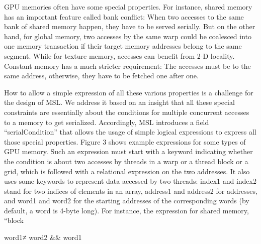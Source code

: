 \documentclass{sig-alternate}
\begin{document}
GPU memories often have some special properties. For instance, shared memory has an important feature called bank conflict: When two accesses to the same bank of shared memory happen, they have to be served serially. But on the other hand, for global memory, two accesses by the same warp could be coalesced into one memory transaction if their target memory addresses belong to the same segment. While for texture memory, accesses can benefit from 2-D locality. Constant memory has a much stricter requirement: The accesses must be to the same address, otherwise, they have to be fetched one after one.

How to allow a simple expression of all these various properties is a challenge for the design of MSL. We address it based on an insight that all these special constraints are essentially about the conditions for multiple concurrent accesses to a memory to get serialized. Accordingly, MSL introduces a field “serialCondition” that allows the usage of simple logical expressions to express all those special properties. Figure 3 shows example expressions for some types of GPU memory. Such an expression must start with a keyword indicating whether the condition is about two accesses by threads in a warp or a thread block or a grid, which is followed with a relational expression on the two addresses. It also uses some keywords to represent data accessed by two threads: index1 and index2 stand for two indices of elements in an array, address1 and address2 for addresses, and word1 and word2 for the starting addresses of the corresponding words (by default, a word is 4-byte long). For instance, the expression for shared memory, “block{word1≠ word2 && word1 %

}
\end{document}
